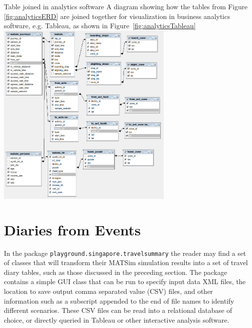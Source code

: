 \createfigure%
{Table joined in analytics software}%
{A diagram showing how the tables from Figure \ref{fig:analyticsERD} are joined together for visualization in business analytics software, e.g. Tableau, as shown in Figure~\ref{fig:analyticsTableau}}%
{\label{fig:analyticsJoin}}%
{\includegraphics[width=0.65\textwidth, angle=0]{extending/figures/businessanalytics/join}}%
{}



\section{Diaries from Events}
In the package \lstinline|playground.singapore.travelsummary| the reader may find a set of classes that will transform their MATSim simulation results into a set of travel diary tables, such as those discussed in the preceding section. The package contains a simple GUI class that can be run to specify input data XML files, the location to save output comma separated value (CSV) files, and other information such as a subscript appended to the end of file names to identify different scenarios. These CSV files can be read into a relational database of choice, or directly queried in Tableau or other interactive analysis software.





